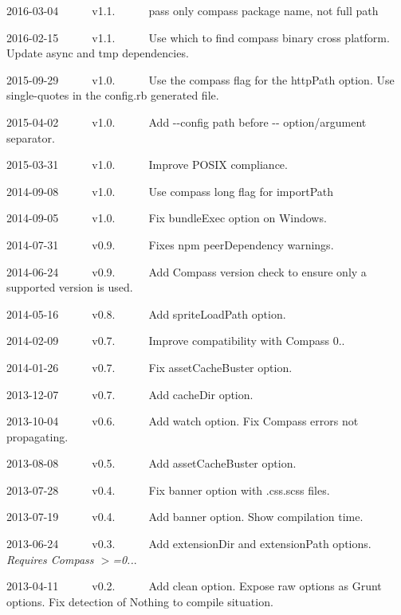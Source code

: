 \begin{DoxyItemize}
\item 2016-\/03-\/04   v1.1.   pass only compass package name, not full path
\item 2016-\/02-\/15   v1.1.   \+Use {\ttfamily which} to find compass binary cross platform. Update async and tmp dependencies.
\item 2015-\/09-\/29   v1.0.   \+Use the {\ttfamily compass} flag for the {\ttfamily http\+Path} option. Use single-\/quotes in the config.\+rb generated file.
\item 2015-\/04-\/02   v1.0.   \+Add {\ttfamily -\/-\/config} path before {\ttfamily -\/-\/} option/argument separator.
\item 2015-\/03-\/31   v1.0.   \+Improve P\+O\+S\+IX compliance.
\item 2014-\/09-\/08   v1.0.   \+Use compass long flag for {\ttfamily import\+Path}
\item 2014-\/09-\/05   v1.0.   \+Fix {\ttfamily bundle\+Exec} option on Windows.
\item 2014-\/07-\/31   v0.9.   \+Fixes npm peer\+Dependency warnings.
\item 2014-\/06-\/24   v0.9.   \+Add Compass version check to ensure only a supported version is used.
\item 2014-\/05-\/16   v0.8.   \+Add {\ttfamily sprite\+Load\+Path} option.
\item 2014-\/02-\/09   v0.7.   \+Improve compatibility with Compass 0..
\item 2014-\/01-\/26   v0.7.   \+Fix {\ttfamily asset\+Cache\+Buster} option.
\item 2013-\/12-\/07   v0.7.   \+Add {\ttfamily cache\+Dir} option.
\item 2013-\/10-\/04   v0.6.   \+Add {\ttfamily watch} option. Fix Compass errors not propagating.
\item 2013-\/08-\/08   v0.5.   \+Add {\ttfamily asset\+Cache\+Buster} option.
\item 2013-\/07-\/28   v0.4.   \+Fix {\ttfamily banner} option with {\ttfamily .css.\+scss} files.
\item 2013-\/07-\/19   v0.4.   \+Add {\ttfamily banner} option. Show compilation time.
\item 2013-\/06-\/24   v0.3.   \+Add {\ttfamily extension\+Dir} and {\ttfamily extension\+Path} options. {\itshape Requires Compass $>$=0..}.
\item 2013-\/04-\/11   v0.2.   \+Add {\ttfamily clean} option. Expose {\ttfamily raw} options as Grunt options. Fix detection of {\ttfamily Nothing to compile} situation.

\end{DoxyItemize}
